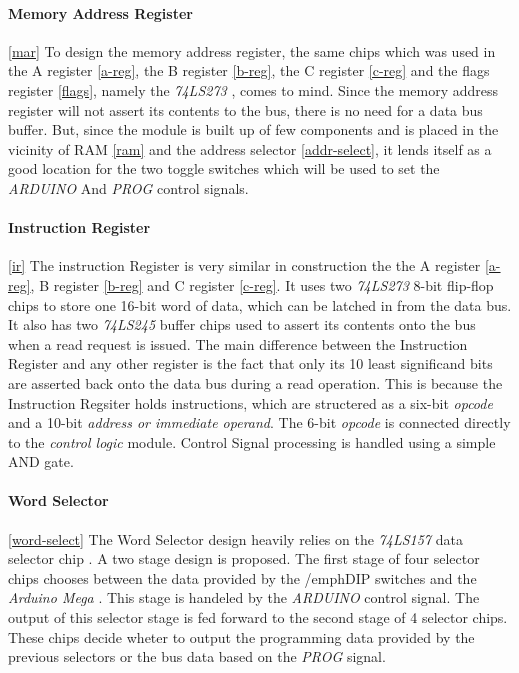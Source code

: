  

 \paragraph{Memory Address Register} \ref{mar}
 To design the memory address register, the same chips which was used in the A register \ref{a-reg}, the B register \ref{b-reg},
 the C register \ref{c-reg} and the flags register \ref{flags}, namely the \emph{74LS273}
  \cite{74ls273} , comes to mind. Since the memory address register will not assert its contents to the bus, there is no need for
 a data bus buffer. But, since the module is built up of few components and is placed in the vicinity of RAM \ref{ram} and the
 address selector \ref{addr-select}, it lends itself as a good location for the two toggle switches which will be used to
 set the \emph{ARDUINO} And \emph{PROG} control signals.

 

 \paragraph{Instruction Register} \ref{ir}
 The instruction Register is very similar in construction the the A register \ref{a-reg}, B register \ref{b-reg} and C register
 \ref{c-reg}. It uses two \emph{74LS273} \cite{74ls273} 8-bit flip-flop chips to store one 16-bit word of data, which can be
 latched in from the data bus. It also has two \emph{74LS245} buffer chips used to assert its contents onto the bus when a read
 request is issued. The main difference between the Instruction Register and any other register is the fact that only its 10
 least significand bits are asserted back onto the data bus during a read operation. This is because the Instruction Regsiter
 holds instructions, which are structered as a six-bit \emph{opcode} and a 10-bit \emph{address or immediate operand}. The 6-bit
 \emph{opcode} is connected directly to the \emph{control logic} module. Control Signal processing is handled using a simple
 AND gate.

 

 \paragraph{Word Selector} \ref{word-select}
 The Word Selector design heavily relies on the \emph{74LS157} data selector chip \cite{74ls157}. A two stage design is proposed.
 The first stage of four selector chips chooses between the data provided by the /emph{DIP switches} and the \emph{Arduino Mega}
 \cite{arduino2020mega}. This stage is handeled by the \emph{ARDUINO} control signal. The output of this selector stage is fed
 forward to the second stage of 4 selector chips. These chips decide wheter to output the programming data provided by the
 previous selectors or the bus data based on the \emph{PROG} signal.

